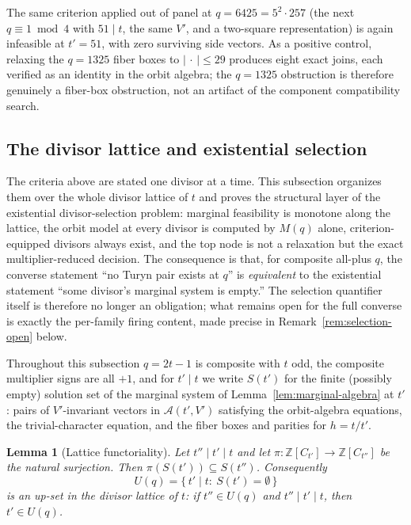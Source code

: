 \documentclass[11pt]{article}
\theoremstyle{plain}
\newtheorem{lemma}[theorem]{Lemma}
\theoremstyle{definition}
\theoremstyle{remark}
\newcommand{\Z}{\mathbb Z}
\begin{document}
The same criterion applied out of panel at $q=6425=5^2\cdot257$ (the next
$q\equiv1\bmod4$ with $51\mid t$, the same $V'$, and a two-square
representation) is again infeasible at $t'=51$, with zero surviving side
vectors. As a positive control, relaxing the $q=1325$ fiber boxes to
$|\,\cdot\,|\le29$ produces eight exact joins, each verified as an identity in
the orbit algebra; the $q=1325$ obstruction is therefore genuinely a fiber-box
obstruction, not an artifact of the component compatibility search.

\subsection{The divisor lattice and existential selection}
\label{sec:divisor-lattice}

The criteria above are stated one divisor at a time.  This subsection
organizes them over the whole divisor lattice of $t$ and proves the
structural layer of the existential divisor-selection problem: marginal
feasibility is monotone along the lattice, the orbit model at every divisor
is computed by $M(q)$ alone, criterion-equipped divisors always exist, and
the top node is not a relaxation but the exact multiplier-reduced decision.
The consequence is that, for composite all-plus $q$, the converse statement
``no Turyn pair exists at $q$'' is \emph{equivalent} to the existential
statement ``some divisor's marginal system is empty.''  The selection
quantifier itself is therefore no longer an obligation; what remains open
for the full converse is exactly the per-family firing content, made precise
in Remark~\ref{rem:selection-open} below.

Throughout this subsection $q=2t-1$ is composite with $t$ odd, the composite
multiplier signs are all $+1$, and for $t'\mid t$ we write $S(t')$ for the
finite (possibly empty) solution set of the marginal system of
Lemma~\ref{lem:marginal-algebra} at $t'$: pairs of $V'$-invariant vectors in
$\mathcal A(t',V')$ satisfying the orbit-algebra equations, the
trivial-character equation, and the fiber boxes and parities for $h=t/t'$.

\begin{lemma}[Lattice functoriality]\label{lem:lattice-functoriality}
Let $t''\mid t'\mid t$ and let $\pi:\Z[C_{t'}]\to\Z[C_{t''}]$ be the natural
surjection.  Then $\pi(S(t'))\subseteq S(t'')$.  Consequently
\[
  U(q)=\{\,t'\mid t:\ S(t')=\emptyset\,\}
\]
is an up-set in the divisor lattice of $t$: if $t''\in U(q)$ and
$t''\mid t'\mid t$, then $t'\in U(q)$.
\end{lemma}
\end{document}
